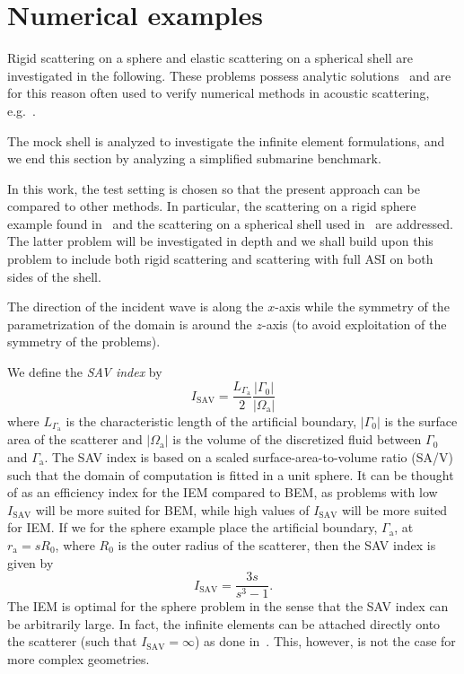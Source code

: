 \section{Numerical examples} 
\label{Sec2:resultsDisc}
Rigid scattering on a sphere and elastic scattering on a spherical shell are investigated in the following. These problems possess analytic solutions~\cite{Venas2019e3s} and are for this reason often used to verify numerical methods in acoustic scattering, e.g.~\cite{Gerdes1996so3,Ihlenburg1998fea,Simpson2014aib,Gerdes1998tcv,Gerdes1999otp,Coox2017aii}.  

The mock shell is analyzed to investigate the infinite element formulations, and we end this section by analyzing a simplified submarine benchmark.

In this work, the test setting is chosen so that the present approach can be compared to other methods. In particular, the scattering on a rigid sphere example found in~\cite{Simpson2014aib} and the scattering on a spherical shell used in~\cite{Ihlenburg1998fea} are addressed. The latter problem will be investigated in depth and we shall build upon this problem to include both rigid scattering and scattering with full ASI on both sides of the shell.

The direction of the incident wave is along the $x$-axis while the symmetry of the parametrization of the domain is around the $z$-axis (to avoid exploitation of the symmetry of the problems).

We define the \textit{SAV index} by
\begin{equation}
	I_{\mathrm{SAV}} = \frac{L_{\Gamma_{\mathrm{a}}}}{2}\frac{|\Gamma_0|}{|\Omega_{\mathrm{a}}|}
\end{equation}
where $L_{\Gamma_{\mathrm{a}}}$ is the characteristic length of the artificial boundary, $|\Gamma_0|$ is the surface area of the scatterer and $|\Omega_{\mathrm{a}}|$ is the volume of the discretized fluid between $\Gamma_0$ and $\Gamma_{\mathrm{a}}$. The SAV index is based on a scaled surface-area-to-volume ratio (SA/V) such that the domain of computation is fitted in a unit sphere. It can be thought of as an efficiency index for the IEM compared to BEM, as problems with low $I_{\mathrm{SAV}}$ will be more suited for BEM, while high values of $I_{\mathrm{SAV}}$ will be more suited for IEM. If we for the sphere example place the artificial boundary, $\Gamma_{\mathrm{a}}$, at $r_{\mathrm{a}}=sR_0$, where $R_0$ is the outer radius of the scatterer, then the SAV index is given by
\begin{equation}
	I_{\mathrm{SAV}} = \frac{3s}{s^3-1}.
\end{equation}
The IEM is optimal for the sphere problem in the sense that the SAV index can be arbitrarily large. In fact, the infinite elements can be attached directly onto the scatterer (such that ${I_{\mathrm{SAV}}=\infty}$) as done in~\cite{Shirron2002aie}. This, however, is not the case for more complex geometries. 

